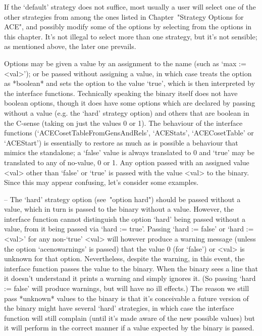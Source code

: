 If the `default' strategy does not suffice, most usually a  user  will
select one of the other strategies  from  among  the  ones  listed  in
Chapter~"Strategy Options for ACE", and possibly modify  some  of  the
options by selecting from  the  options  in  this  chapter.  It's  not
illegal to select more than one strategy, but it's  not  sensible;  as
mentioned above, the later one prevails.


Options may be given a value by an assignment to  the  name  (such  as
`max := <val>'); or be passed without assigning  a  value,  in  which
case {\GAP} treats the option as *boolean* and sets the option to  the
value `true', which  is  then  interpreted  by  the  {\ACE}  interface
functions. Technically speaking the {\ACE} binary itself does not have
boolean options, though it does have some options which  are  declared
by passing without a value  (e.g.  the  `hard'  strategy  option)  and
others that are boolean in the C-sense (taking on just the values 0 or
1).   The   behaviour    of    the    {\ACE}    interface    functions
(`ACECosetTableFromGensAndRels',   `ACEStats',   `ACECosetTable'    or
`ACEStart') is essentially  to  restore  as  much  as  is  possible  a
behaviour that mimics the {\ACE} standalone; a `false' value is always
translated to 0 and `true' may be translated to any of no-value, 0  or
1. Any option passed with an assigned value <val> other  than  `false'
or `true' is passed with the value <val> to the {\ACE}  binary.  Since
this may appear confusing, let's consider some examples.

\beginlist%

\item{--} The `hard' strategy option  (see~"option  hard")  should  be
passed without a value, which in turn is passed to the  {\ACE}  binary
without  a  value.  However,  the  {\ACE}  interface  function  cannot
distinguish the option `hard' being passed without a  value,  from  it
being passed via `hard := true'. Passing `hard := false' or  `hard  :=
<val>' for any non-`true' <val> will however produce a warning message
(unless the option `acenowarnings' is passed) that the  value  0  (for
`false') or <val> is unknown for that  option.  Nevertheless,  despite
the warning, in this event, the {\ACE} interface function  passes  the
value to the {\ACE} binary. When the {\ACE} binary sees a line that it
doesn't understand it prints a warning  and  simply  ignores  it.  (So
passing `hard := false' will produce warnings, but will  have  no  ill
effects.) The reason we still pass  *unknown*  values  to  the  {\ACE}
binary is that it's conceivable a future version of the {\ACE}  binary
might have  several  `hard'  strategies,  in  which  case  the  {\ACE}
interface function will still complain (until it's made aware  of  the
new possible values) but it will perform in the correct  manner  if  a
value expected by the {\ACE} binary is passed.

